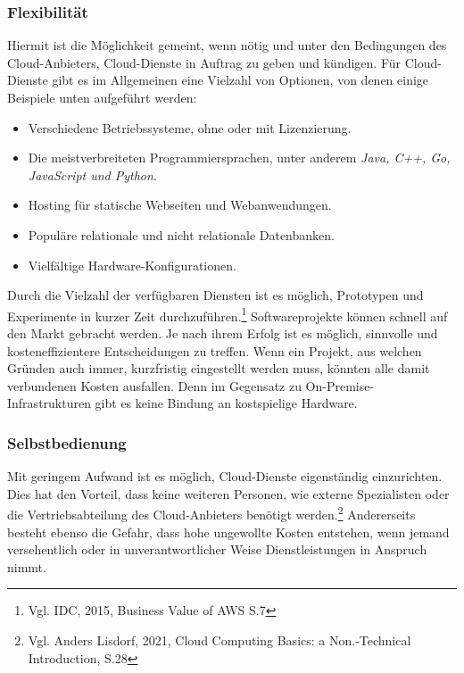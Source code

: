 \subsubsection{Flexibilität}%
Hiermit ist die Möglichkeit gemeint, wenn nötig und unter den Bedingungen des Cloud-Anbieters, Cloud-Dienste in Auftrag zu geben und kündigen. Für Cloud-Dienste gibt es im Allgemeinen eine Vielzahl von Optionen, von denen einige Beispiele unten aufgeführt werden:
\begin{itemize}
\item
    Verschiedene Betriebssysteme, ohne oder mit Lizenzierung.
\item
    Die meistverbreiteten Programmiersprachen, unter anderem \textit{Java, C++, Go, JavaScript und Python}.{\cite{AMZ03}}
\item
    Hosting für statische Webseiten und Webanwendungen{\cite{AMZ04}}.
\item
    Populäre relationale und nicht relationale Datenbanken{\cite{AMZ10}}.           
\item
    Vielfältige Hardware-Konfigurationen.

\end{itemize}
Durch die Vielzahl der verfügbaren Diensten ist es möglich, Prototypen und Experimente in kurzer Zeit durchzuführen.\footnote{Vgl. IDC, 2015, Business Value of AWS S.7\cite{IDC01}} Softwareprojekte können schnell auf den Markt gebracht werden. Je nach ihrem Erfolg ist es möglich, sinnvolle und kosteneffizientere Entscheidungen zu treffen. Wenn ein Projekt, aus welchen Gründen auch immer, kurzfristig eingestellt werden muss, könnten alle damit verbundenen Kosten ausfallen. Denn im Gegensatz zu On-Premise-Infrastrukturen gibt es keine Bindung an kostspielige Hardware.

\subsubsection{Selbstbedienung}
Mit geringem Aufwand ist es möglich, Cloud-Dienste eigenständig einzurichten. Dies hat den Vorteil, dass keine weiteren Personen, wie externe Spezialisten oder die Vertriebsabteilung des Cloud-Anbieters  benötigt werden.\footnote{Vgl. Anders Lisdorf, 2021, Cloud Computing Basics: a Non.-Technical Introduction, S.28\cite{CCB}}
Andererseits besteht ebenso die Gefahr, dass hohe ungewollte Kosten entstehen, wenn jemand versehentlich oder in unverantwortlicher Weise Dienstleistungen in Anspruch nimmt.    

